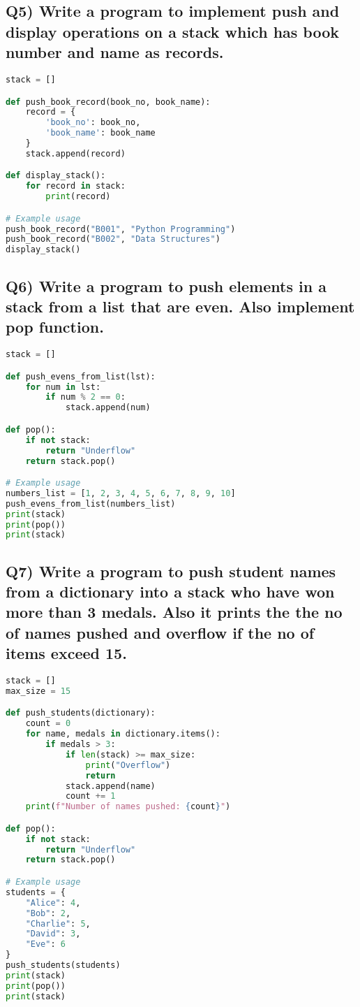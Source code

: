 \documentclass{article}
\begin{document}
\subsection*{Q5) Write a program to implement push and display operations on a stack which has book number and name as records.}
\begin{lstlisting}[language=Python]
stack = []

def push_book_record(book_no, book_name):
    record = {
        'book_no': book_no,
        'book_name': book_name
    }
    stack.append(record)

def display_stack():
    for record in stack:
        print(record)

# Example usage
push_book_record("B001", "Python Programming")
push_book_record("B002", "Data Structures")
display_stack()
\end{lstlisting}

\subsection*{Q6) Write a program to push elements in a stack from a list that are even. Also implement pop function.}
\begin{lstlisting}[language=Python]
stack = []

def push_evens_from_list(lst):
    for num in lst:
        if num % 2 == 0:
            stack.append(num)

def pop():
    if not stack:
        return "Underflow"
    return stack.pop()

# Example usage
numbers_list = [1, 2, 3, 4, 5, 6, 7, 8, 9, 10]
push_evens_from_list(numbers_list)
print(stack)
print(pop())
print(stack)
\end{lstlisting}

\subsection*{Q7) Write a program to push student names from a dictionary into a stack who have won more than 3 medals. Also it prints the the no of names pushed and overflow if the no of items exceed 15.}
\begin{lstlisting}[language=Python]
stack = []
max_size = 15

def push_students(dictionary):
    count = 0
    for name, medals in dictionary.items():
        if medals > 3:
            if len(stack) >= max_size:
                print("Overflow")
                return
            stack.append(name)
            count += 1
    print(f"Number of names pushed: {count}")

def pop():
    if not stack:
        return "Underflow"
    return stack.pop()

# Example usage
students = {
    "Alice": 4,
    "Bob": 2,
    "Charlie": 5,
    "David": 3,
    "Eve": 6
}
push_students(students)
print(stack)
print(pop())
print(stack)
\end{lstlisting}
\end{document}
